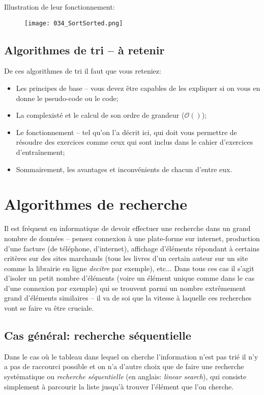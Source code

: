 \documentclass[12pt]{article}
\begin{document}
	Illustration de leur fonctionnement:
	\begin{figure}[H]
		\centering
		\texttt{[image: 034\_SortSorted.png]}
	\end{figure}
	
	\subsection{Algorithmes de tri -- à retenir}
		\begin{MonRet}
		De ces algorithmes de tri il faut que vous reteniez:
		\begin{itemize}
			\item Les principes de base -- vous devez être capables de les expliquer si on vous en donne le pseudo-code ou le code;
			\item La complexisté et le calcul de son ordre de grandeur ($\mathcal{O}()$);
			\item Le fonctionnement -- tel qu'on l'a décrit ici, qui doit vous permettre de résoudre des exercices comme ceux qui sont inclus dans le cahier d'exercices d'entraînement;
			\item Sommairement, les avantages et inconvénients de chacun d'entre eux.
		\end{itemize}
	\end{MonRet}
	
	\pagebreak
	\section{Algorithmes de recherche}
	Il est fréquent en informatique de devoir effectuer une recherche dans un grand nombre de données -- pensez connexion à une plate-forme sur internet, production d'une facture (de téléphone, d'internet), affichage d'éléments répondant à certains critères sur des sites marchands (tous les livres d'un certain auteur sur un site comme la librairie en ligne \textit{decitre} par exemple), etc... Dans tous ces cas il s'agit d'isoler un petit nombre d'éléments (voire un élément unique comme dans le cas d'une connexion par exemple) qui se trouvent parmi un nombre extrêmement grand d'éléments similaires -- il va de soi que la vitesse à laquelle ces recherches vont se faire va être cruciale.
	
	\subsection{Cas général: recherche séquentielle}
	Dans le cas où le tableau dans lequel on cherche l'information n'est pas trié il n'y a pas de raccourci possible et on n'a d'autre choix que de faire une recherche systématique ou \textit{recherche séquentielle} (en anglais: \textit{linear search}), qui consiste simplement à parcourir la liste jusqu'à trouver l'élément que l'on cherche.
	
\end{document}
